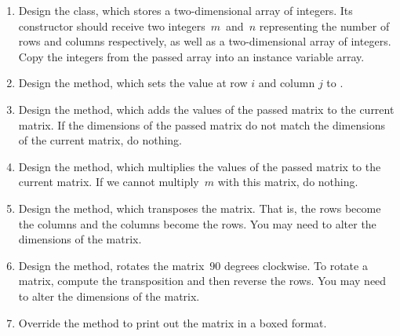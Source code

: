 \begin{enumerate}[label=(\alph*)]
    \item Design the  class, which stores a two-dimensional array of integers. Its constructor should receive two integers~$m$~and~$n$ representing the number of rows and columns respectively, as well as a two-dimensional array of integers. Copy the integers from the passed array into an instance variable array.
    \item Design the  method, which sets the value at row $i$ and column $j$ to .
    \item Design the  method, which adds the values of the passed matrix to the current matrix. If the dimensions of the passed matrix do not match the dimensions of the current matrix, do nothing.
    \item Design the  method, which multiplies the values of the passed matrix to the current matrix. If we cannot multiply~$m$ with this matrix, do nothing.
    \item Design the  method, which transposes the matrix. That is, the rows become the columns and the columns become the rows. You may need to alter the dimensions of the matrix.
    \item Design the  method, rotates the matrix~$90$ degrees clockwise. To rotate a matrix, compute the transposition and then reverse the rows. You may need to alter the dimensions of the matrix.
    \item Override the  method to print out the matrix in a boxed format.
\end{enumerate}

